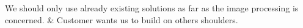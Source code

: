 \nextItem We should only use already existing solutions as far as the image processing is concerned. & Customer wants us to build on others shoulders.